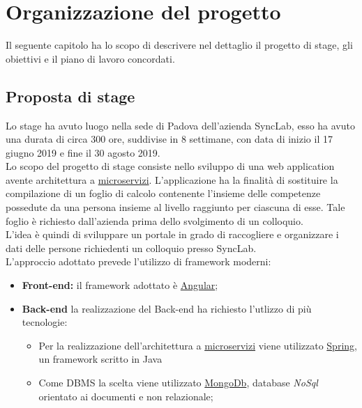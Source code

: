 
\chapter{Organizzazione del progetto}
\label{cap:organizzazione-del-progetto}
Il seguente capitolo ha lo scopo di descrivere nel dettaglio il progetto di stage, gli obiettivi e il piano di lavoro concordati.

\section{Proposta di stage}
Lo stage ha avuto luogo nella sede di Padova dell'azienda SyncLab, esso ha avuto una durata di circa 300 ore, suddivise in 8 settimane, con data di inizio il 17 giugno 2019 e fine il 30 agosto 2019. \\
Lo scopo del progetto di stage consiste nello sviluppo di una \gls{web application} avente architettura a \hyperref[micro]{microservizi}.
L'applicazione ha la finalità di sostituire la compilazione di un foglio di calcolo contenente l'insieme delle competenze possedute da una persona insieme al livello raggiunto per ciascuna di esse. Tale foglio è richiesto dall'azienda prima dello svolgimento di un colloquio.\\
L'idea è quindi di sviluppare un portale in grado di raccogliere e organizzare i dati delle persone richiedenti un colloquio presso SyncLab.\\
L'approccio adottato prevede l'utilizzo di \gls{framework} moderni:

\begin{itemize}
	\item \textbf{Front-end:} il \gls{framework} adottato è \hyperref[angular]{Angular};
	\item \textbf{Back-end} la realizzazione del \gls{Back-end} ha richiesto l'utlizzo di più tecnologie:
	\begin{itemize}
		\item Per la realizzazione dell'architettura a \hyperref[micro]{microservizi} viene utilizzato \hyperref[tech-spring]{Spring}, un \gls{framework} scritto in \gls{Java}
		\item Come \gls{DBMS} la scelta viene utilizzato \hyperref[mongodb]{MongoDb}, database \textit{NoSql} orientato ai documenti e non relazionale;
	\end{itemize}
\end{itemize}

